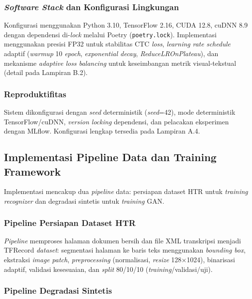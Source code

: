 \documentclass[12pt,a4paper]{book}
\begin{document}
\subsubsection{\textit{Software Stack} dan Konfigurasi Lingkungan}
\label{subsubsec:software-spec}

Konfigurasi menggunakan Python 3.10, TensorFlow 2.16, CUDA 12.8, cuDNN 8.9 dengan dependensi di-\textit{lock} melalui Poetry (\texttt{poetry.lock}). Implementasi menggunakan presisi FP32 untuk stabilitas CTC \textit{loss}, \textit{learning rate schedule} adaptif (\textit{warmup} 10 \textit{epoch}, \textit{exponential decay}, \textit{ReduceLROnPlateau}), dan mekanisme \textit{adaptive loss balancing} untuk keseimbangan metrik visual-tekstual (detail pada Lampiran B.2).

\subsubsection{Reproduktifitas}
\label{subsubsec:reproducibility}

Sistem dikonfigurasi dengan \textit{seed} deterministik (\textit{seed}=42), mode deterministik TensorFlow/cuDNN, \textit{version locking} dependensi, dan pelacakan eksperimen dengan MLflow. Konfigurasi lengkap tersedia pada Lampiran A.4.

\subsection{Implementasi Pipeline Data dan Training Framework}
\label{subsec:implementasi-pipeline}

Implementasi mencakup dua \textit{pipeline} data: persiapan dataset HTR untuk \textit{training recognizer} dan degradasi sintetis untuk \textit{training} GAN.

\subsubsection{Pipeline Persiapan Dataset HTR}
\label{subsubsec:dataset-htr-pipeline}

\textit{Pipeline} memproses halaman dokumen bersih dan file XML transkripsi menjadi TFRecord \textit{dataset}: segmentasi halaman ke baris teks menggunakan \textit{bounding box}, ekstraksi \textit{image patch}, \textit{preprocessing} (normalisasi, \textit{resize} 128×1024), binarisasi adaptif, validasi kesesuaian, dan \textit{split} 80/10/10 (\textit{training}/validasi/uji).

\subsubsection{Pipeline Degradasi Sintetis}
\label{subsubsec:synthetic-degradation-pipeline}
\end{document}
